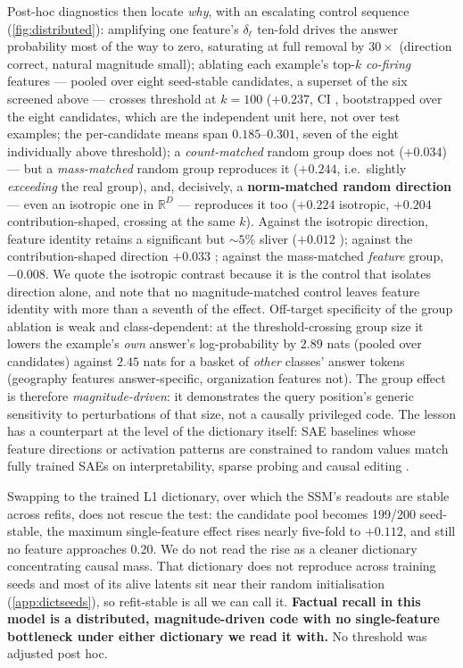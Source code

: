 Post-hoc diagnostics then locate \emph{why}, with an escalating control
sequence
(\cref{fig:distributed}): amplifying one feature's $\delta_\ell$ ten-fold
drives the answer probability most of the way to zero, saturating at full
removal by $30\times$ (direction correct, natural magnitude small); ablating
each example's top-$k$ \emph{co-firing} features --- pooled over eight
seed-stable candidates, a superset of the six screened above --- crosses
threshold at $k{=}100$ ($+0.237$, CI , bootstrapped over the
eight candidates, which are the independent unit here, not over test
examples; the per-candidate means span $0.185$--$0.301$, seven of the eight
individually above threshold); a
\emph{count-matched} random group does not ($+0.034$) --- but a
\emph{mass-matched} random group reproduces it ($+0.244$, i.e.\ slightly
\emph{exceeding} the real group), and, decisively, a
\textbf{norm-matched random direction} --- even an isotropic one in
$\mathbb{R}^D$ --- reproduces it too ($+0.224$ isotropic, $+0.204$
contribution-shaped, crossing at the same $k$). Against the isotropic
direction, feature identity retains a significant but ${\sim}5\%$ sliver
($+0.012$ ); against the contribution-shaped direction
$+0.033$ ; against the mass-matched \emph{feature}
group, $-0.008$. We quote the isotropic contrast because it is the control
that isolates direction alone, and note that no magnitude-matched control
leaves feature identity with more than a seventh of the effect.
Off-target specificity of the group ablation is weak and class-dependent: at
the threshold-crossing group size it lowers the example's \emph{own} answer's
log-probability by $2.89$ nats (pooled over candidates) against $2.45$ nats
for a basket of \emph{other} classes' answer tokens (geography features
answer-specific, organization features not). The group effect is therefore \emph{magnitude-driven}: it
demonstrates the query position's generic sensitivity to perturbations of
that size, not a causally privileged code. The lesson has a counterpart at
the level of the dictionary itself: SAE baselines whose feature directions or
activation patterns are constrained to random values match fully trained
SAEs on interpretability, sparse probing and causal editing
\citep{korznikov2026sanity}.

Swapping to the trained L1 dictionary, over which the SSM's readouts are
stable across refits, does not rescue the test: the candidate pool becomes
199/200 seed-stable, the maximum single-feature effect rises nearly five-fold
to $+0.112$, and still no feature approaches 0.20. We do not read the rise as
a cleaner dictionary concentrating causal mass. That dictionary does not
reproduce across training seeds and most of its alive latents sit near their
random initialisation (\cref{app:dictseeds}), so refit-stable is all we can
call it.
\textbf{Factual recall in this model is a distributed, magnitude-driven code
with no single-feature bottleneck under either dictionary we read it with.}
No threshold was adjusted post hoc.

